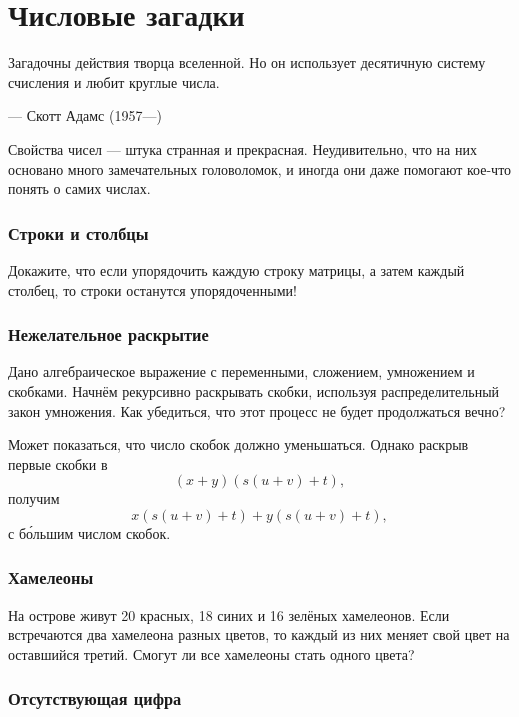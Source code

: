 \chapter{Числовые загадки}


\setlength{\epigraphwidth}{.70\textwidth}
\epigraph{Загадочны действия творца вселенной.
Но он использует десятичную систему счисления и любит круглые
числа.
}{--- Скотт Адамс (1957---)}


Свойства чисел --- штука странная и прекрасная.
Неудивительно, что на них основано много замечательных головоломок, и иногда они даже помогают кое-что понять о самих числах.

\subsection*{Строки и столбцы}

Докажите, что если упорядочить каждую строку матрицы, а затем каждый столбец, то строки останутся упорядоченными!

\subsection*{Нежелательное раскрытие}

Дано алгебраическое выражение с переменными, сложением, умножением и скобками.
Начнём рекурсивно раскрывать скобки, используя распределительный закон умножения.
Как убедиться, что этот процесс не будет продолжаться вечно?

Может показаться, что число скобок должно уменьшаться.
Однако раскрыв первые скобки в
\[(x + y)(s(u + v) + t),\]
получим
\[x(s(u + v) + t) + y(s(u + v) + t),\]
с б\'{о}льшим числом скобок.

\subsection*{Хамелеоны}\label{Хамелеоны}

На острове живут 20 красных, 18 синих и 16 зелёных хамелеонов.
Если встречаются два хамелеона разных цветов, то каждый из них меняет свой цвет на оставшийся третий.
Смогут ли все хамелеоны стать одного цвета?

\subsection*{Отсутствующая цифра}

